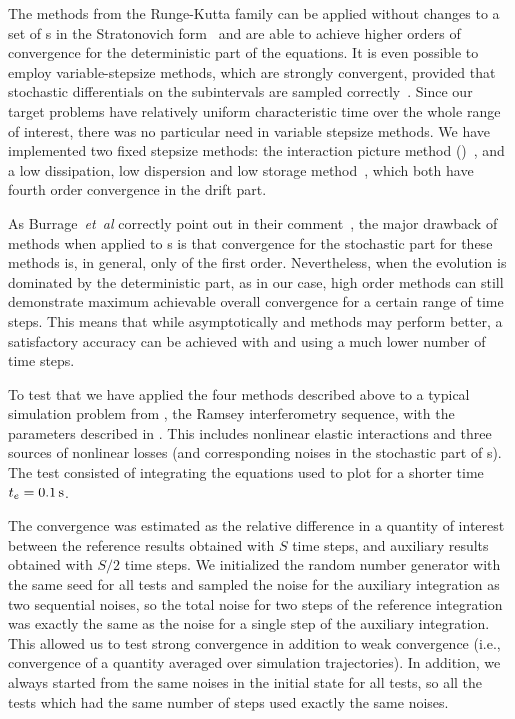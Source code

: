 The methods from the Runge-Kutta family can be applied without changes to a set of s in the Stratonovich form~\cite{Wilkie2004,Wilkie2005} and are able to achieve higher orders of convergence for the deterministic part of the equations.
It is even possible to employ variable-stepsize methods, which are strongly convergent, provided that stochastic differentials on the subintervals are sampled correctly~\cite{Wilkie2005}.
Since our target problems have relatively uniform characteristic time over the whole range of interest, there was no particular need in variable stepsize methods.
We have implemented two fixed stepsize  methods: the  interaction picture method ()~\cite{CaradocDavies2000}, and a low dissipation, low dispersion and low storage  method~\cite{Berland2006}, which both have fourth order convergence in the drift part.

As Burrage~\textit{et~al} correctly point out in their comment~\cite{Burrage2006}, the major drawback of  methods when applied to s is that convergence for the stochastic part for these methods is, in general, only of the first order.
Nevertheless, when the evolution is dominated by the deterministic part, as in our case, high order methods can still demonstrate maximum achievable overall convergence for a certain range of time steps.
This means that while asymptotically  and  methods may perform better, a satisfactory accuracy can be achieved with  and  using a much lower number of time steps.

To test that we have applied the four methods described above to a typical simulation problem from , the Ramsey interferometry sequence, with the parameters described in .
This includes nonlinear elastic interactions and three sources of nonlinear losses (and corresponding noises in the stochastic part of s).
The test consisted of integrating the equations used to plot  for a shorter time $t_e=0.1\mbox{\ensuremath{\,\mathrm{s}}}$.

The convergence was estimated as the relative difference in a quantity of interest between the reference results obtained with $S$ time steps, and auxiliary results obtained with $S / 2$ time steps.
We initialized the random number generator with the same seed for all tests and sampled the noise for the auxiliary integration as two sequential noises, so the total noise for two steps of the reference integration was exactly the same as the noise for a single step of the auxiliary integration.
This allowed us to test strong convergence in addition to weak convergence (i.e., convergence of a quantity averaged over simulation trajectories).
In addition, we always started from the same noises in the initial state for all tests, so all the tests which had the same number of steps used exactly the same noises.


